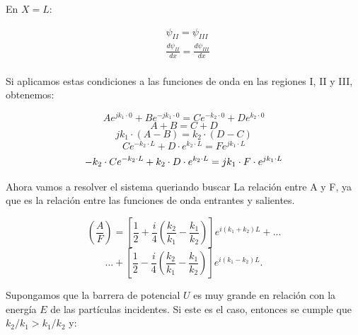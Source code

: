 \documentclass[a4paper]{article}
\begin{document}
            \indent En $X=L$:

            \begin{align*}
                &\psi_{II} = \psi_{III} \\
                &\frac{d\psi_{II}}{dx} = \frac{d\psi_{III}}{dx} \\
            \end{align*}

            \indent Si aplicamos estas condiciones a las funciones de onda en las regiones I, II y III, obtenemos:

            \begin{equation*}
                Ae^{jk_1 \cdot 0} + Be^{-jk_1 \cdot 0} = Ce^{-k_2 \cdot 0} + De^{k_2 \cdot 0}
            \end{equation*}
            \begin{equation}
            A + B = C + D
            \end{equation}
            \begin{equation}
                jk_1 \cdot (A - B) = k_2 \cdot (D - C)
            \end{equation}
            \begin{equation}
                Ce^{-k_2 \cdot L} + D \cdot e^{k_2 \cdot L} = Fe^{jk_1\cdot L}
            \end{equation}
            \begin{equation}
                           -k_2 \cdot Ce^{-k_2 \cdot L} + k_2 \cdot D \cdot e^{k_2 \cdot L} = jk_1 \cdot F \cdot e^{jk_1 \cdot L} \\
            \end{equation}

            \indent Ahora vamos a resolver el sistema queriando buscar La relación entre A y F, ya que es la relación entre las funciones de onda entrantes y salientes.

            \begin{equation*}
                \left( \frac{A}{F} \right) =
                \left[ \frac{1}{2} + \frac{i}{4} \left( \frac{k_2}{k_1} - \frac{k_1}{k_2} \right) \right] e^{i(k_1 + k_2)L}
                +...
            \end{equation*}
            \begin{equation*}
                ...+\left[ \frac{1}{2} - \frac{i}{4} \left( \frac{k_2}{k_1} - \frac{k_1}{k_2} \right) \right] e^{i(k_1 - k_2)L}.
            \end{equation*}

            \indent Supongamos que la barrera de potencial $U$ es muy grande en relación con la energía $E$ de las partículas incidentes. Si este es el caso, entonces se cumple que $k_2 / k_1 > k_1 / k_2$ y:
\end{document}
